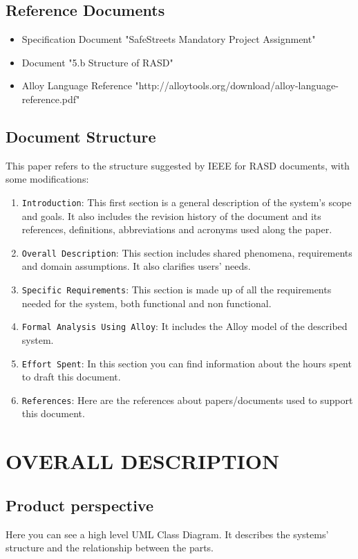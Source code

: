 \documentclass[12pt,a4paper]{article}
\begin{document}
\subsection{Reference Documents} 
\begin{itemize}
				\item Specification Document "SafeStreets Mandatory Project Assignment"
				\item Document "5.b Structure of RASD"
				\item Alloy Language Reference "http://alloytools.org/download/alloy-language-reference.pdf"
			\end{itemize}
\subsection{Document Structure} 
	This paper refers to the structure suggested by IEEE for RASD documents, with some modifications:
		\begin{enumerate}
			\item \texttt{Introduction}: This first section is a general description of the system's scope and goals. It also includes the revision history of the document and its references, definitions, abbreviations and acronyms used along the paper.
			\item \texttt{Overall Description}: This section includes shared phenomena, requirements and domain assumptions. It also clarifies users' needs.
			\item \texttt{Specific Requirements}: This section is made up of all the requirements needed for the system, both functional and non functional.
			\item \texttt{Formal Analysis Using Alloy}: It includes the Alloy model of the described system.
			\item \texttt{Effort Spent}: In this section you can find information about the hours spent to draft this document.
			\item \texttt{References}: Here are the references about papers/documents used to support this document.
		\end{enumerate}

\newpage
\section{OVERALL DESCRIPTION}
\subsection{Product perspective}
Here you can see a high level UML Class Diagram. It describes the systems' structure and the relationship between the parts.
\end{document}
